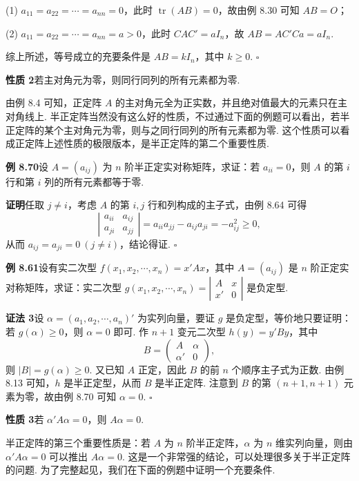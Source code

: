 \documentclass[UTF8,12pt,a4paper,fontset=fandol]{ctexart}
\begin{document}
(1) $a_{11}=a_{22}=\cdots=a_{nn}=0$，此时 $\operatorname{tr}(AB)=0$，故由例 8.30 可知 $AB=O$；

(2) $a_{11}=a_{22}=\cdots=a_{nn}=a>0$，此时 $CAC'=aI_n$，故 $AB=AC'Ca=aI_n$.

综上所述，等号成立的充要条件是 $AB=kI_n$，其中 $k\ge 0$. $\ensuremath{\square}$

\noindent\textbf{性质 2}\quad 若主对角元为零，则同行同列的所有元素都为零.

由例 8.4 可知，正定阵 $A$ 的主对角元全为正实数，并且绝对值最大的元素只在主对角线上. 半正定阵当然没有这么好的性质，不过通过下面的例题可以看出，若半正定阵的某个主对角元为零，则与之同行同列的所有元素都为零. 这个性质可以看成正定阵上述性质的极限版本，是半正定阵的第二个重要性质.

\noindent\textbf{例 8.70}\quad 设 $A=(a_{ij})$ 为 $n$ 阶半正定实对称矩阵，求证：若 $a_{ii}=0$，则 $A$ 的第 $i$ 行和第 $i$ 列的所有元素都等于零.

\noindent\textbf{证明}\quad 任取 $j\ne i$，考虑 $A$ 的第 $i,j$ 行和列构成的主子式，由例 8.64 可得
\[
\left|\begin{array}{cc}
a_{ii} & a_{ij}\\
a_{ji} & a_{jj}
\end{array}\right|
=a_{ii}a_{jj}-a_{ij}a_{ji}=-a_{ij}^2\ge 0,
\]
从而 $a_{ij}=a_{ji}=0\ (j\ne i)$，结论得证. $\ensuremath{\square}$

\noindent\textbf{例 8.61}\quad 设有实二次型 $f(x_1,x_2,\cdots,x_n)=x'Ax$，其中 $A=(a_{ij})$ 是 $n$ 阶正定实对称矩阵，求证：实二次型 $g(x_1,x_2,\cdots,x_n)=\left|\begin{array}{cc}A&x\\ x'&0\end{array}\right|$ 是负定型.

\noindent\textbf{证法 3}\quad 设 $\alpha=(a_1,a_2,\cdots,a_n)'$ 为实列向量，要证 $g$ 是负定型，等价地只要证明：若 $g(\alpha)\ge 0$，则 $\alpha=0$ 即可. 作 $n+1$ 变元二次型 $h(y)=y'By$，其中
\[
B=\left(\begin{array}{cc}
A & \alpha\\
\alpha' & 0
\end{array}\right),
\]
则 $|B|=g(\alpha)\ge 0$. 又已知 $A$ 正定，因此 $B$ 的前 $n$ 个顺序主子式为正数. 由例 8.13 可知，$h$ 是半正定型，从而 $B$ 是半正定阵. 注意到 $B$ 的第 $(n+1,n+1)$ 元素为零，故由例 8.70 可知 $\alpha=0$. $\ensuremath{\square}$

\noindent\textbf{性质 3}\quad 若 $\alpha'A\alpha=0$，则 $A\alpha=0$.

半正定阵的第三个重要性质是：若 $A$ 为 $n$ 阶半正定阵，$\alpha$ 为 $n$ 维实列向量，则由 $\alpha'A\alpha=0$ 可以推出 $A\alpha=0$. 这是一个非常强的结论，可以处理很多关于半正定阵的问题. 为了完整起见，我们在下面的例题中证明一个充要条件.
\end{document}
